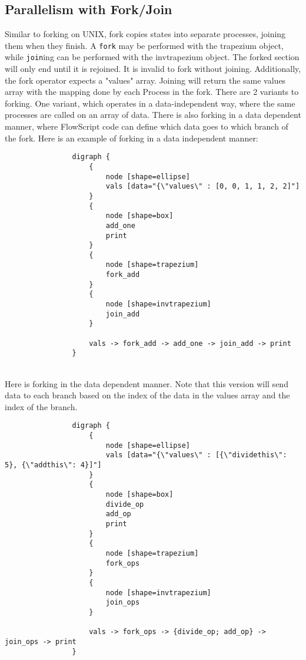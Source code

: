 \documentclass{article}
\begin{document}
			\subsection{Parallelism with Fork/Join} Similar to forking on UNIX, fork copies states into separate processes, joining them when they finish. A \texttt{fork} may be performed with the trapezium object, while \texttt{join}ing can be performed with the invtrapezium object. The forked section will only end until it is rejoined. It is invalid to fork without joining. Additionally, the fork operator expects a "values" array. Joining will return the same values array with the mapping done by each Process in the fork. There are 2 variants to forking. One variant, which operates in a data-independent way, where the same processes are called on an array of data. There is also forking in a data dependent manner, where FlowScript code can define which data goes to which branch of the fork. Here is an example of forking in a data independent manner: \\
			\begin{minipage}{0.5\textwidth}
				\begin{verbatim}
				digraph {
				    {
				        node [shape=ellipse]
				        vals [data="{\"values\" : [0, 0, 1, 1, 2, 2]"]
				    }
				    {
				        node [shape=box]
				        add_one
				        print
				    }
				    {
				        node [shape=trapezium]
				        fork_add
				    }
				    {
				        node [shape=invtrapezium]
				        join_add
				    }

				    vals -> fork_add -> add_one -> join_add -> print
				}
				\end{verbatim}
			\end{minipage}
			\begin{minipage}{0.5\textwidth}
				\centering
				
			\end{minipage} \\ 
			Here is forking in the data dependent manner. Note that this version will send data to each branch based on the index of the data in the values array and the index of the branch.

			\begin{minipage}{0.5\textwidth}
				\begin{verbatim}
				digraph {
				    {
				        node [shape=ellipse]
				        vals [data="{\"values\" : [{\"dividethis\": 5}, {\"addthis\": 4}]"]
				    }
				    {
				        node [shape=box]
				        divide_op
				        add_op
				        print
				    }
				    {
				        node [shape=trapezium]
				        fork_ops
				    }
				    {
				        node [shape=invtrapezium]
				        join_ops
				    }

				    vals -> fork_ops -> {divide_op; add_op} -> join_ops -> print
				}
				\end{verbatim}
			\end{minipage}
			\begin{minipage}{0.5\textwidth}
				\centering
				
			\end{minipage}
			
\end{document}
